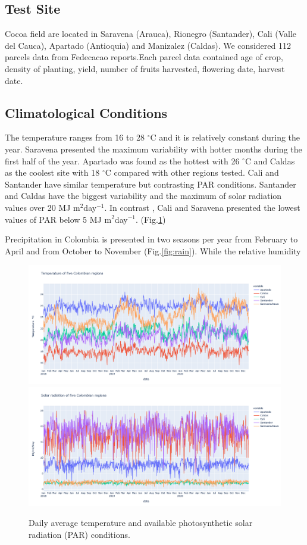 \documentclass[gene,journal,article,submit,moreauthors,pdftex]{Definitions/mdpi}
\begin{document}
\subsection{Test Site}
Cocoa field are located in Saravena (Arauca), Rionegro (Santander), Cali (Valle del Cauca), Apartado (Antioquia) and Manizalez (Caldas). We considered 112 parcels data from Fedecacao reports.Each parcel data contained age of crop, density of planting, yield, number of fruits harvested, flowering date, harvest date. 

\subsection{Climatological Conditions}
The temperature ranges from 16 to 28 $^\circ$C and it is relatively constant during the year. Saravena presented the maximum variability with hotter months during the first half of the year.  Apartado was found as the hottest with 26 $^\circ$C and Caldas as the coolest site with 18 $^\circ$C compared with other regions tested. Cali and Santander have similar temperature but contrasting PAR conditions. Santander and Caldas have the biggest variability and the maximum of solar radiation values over 20 MJ m$^{2}$day$^{-1}$. In contrast , Cali and Saravena presented the lowest values of PAR below 5 MJ m$^{2}$day$^{-1}$. (Fig.\ref{fig:temp})

Precipitation in Colombia is presented in two seasons per year from February to April and from October to November (Fig.\ref{fig:rain}). While the relative humidity 

\begin{figure}[h!]
	\centering
	\caption{\footnotesize {Daily average temperature and available photosynthetic solar radiation (PAR) conditions. \\}}
	\includegraphics[scale=0.25]{images/tempe.png}
	\includegraphics[scale=0.25]{images/SRAD.png}
	\label{fig:temp}
\end{figure}
\end{document}
